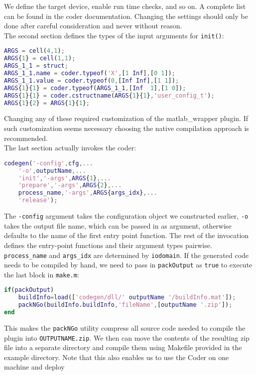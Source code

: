 \documentclass[11pt,a4paper,twoside]{article}
\newcommand{\+}{\discretionary{\mbox{\scriptsize$\hookleftarrow$}}{}{}}
\begin{document}
We define the target device, enable run time checks, and so on.
A complete list can be found in the \Matlab{} coder documentation. Changing the
settings should only be done after careful consideration and never without
reason. \\
The second section defines the types of the input arguments for \texttt{init()}:
\begin{lstlisting}[language=Matlab]
%% Define argument types for entry-point 'init'.
ARGS = cell(4,1);
ARGS{1} = cell(1,1);
ARGS_1_1 = struct;
ARGS_1_1.name = coder.typeof('X',[1 Inf],[0 1]);
ARGS_1_1.value = coder.typeof(0,[Inf Inf],[1 1]);
ARGS{1}{1} = coder.typeof(ARGS_1_1,[Inf  1],[1 0]);
ARGS{1}{1} = coder.cstructname(ARGS{1}{1},'user_config_t');
ARGS{1}{2} = ARGS{1}{1};
\end{lstlisting}
Changing any of these required customization of the matlab\_wrapper plugin. If
such customization seems necessary choosing the native compilation approach is
recommended. \\
The last section actually invokes the \Matlab{} coder:
\begin{lstlisting}[language=Matlab]
codegen('-config',cfg,...
    '-o',outputName,...
    'init','-args',ARGS{1},...
    'prepare','-args',ARGS{2},...
    process_name,'-args',ARGS{args_idx},...
    'release');
\end{lstlisting}
The \texttt{-config} argument takes the configuration object we constructed
earlier, \texttt{-o} takes the output file name, which can be passed in as
argument, otherwise defaults to the name of the first entry point function.
The rest of the invocation defines the entry-point functions and their argument
types pairwise. \texttt{process\_name} and \texttt{args\_idx} are determined by
\texttt{iodomain}.
If the generated code needs to be compiled by hand, we need to
pass in \texttt{packOutput} as \texttt{true} to execute the last block in \texttt{make.m}:
\begin{lstlisting}[language=Matlab]
%% Optionally package the code for deployment elsewhere
if(packOutput)
    buildInfo=load(['codegen/dll/' outputName '/buildInfo.mat']);
    packNGo(buildInfo.buildInfo,'fileName',[outputName '.zip']);
end
\end{lstlisting}
This makes the \texttt{packNGo} utility compress all source code needed to compile
the plugin into \texttt{OUTPUTNAME.zip}.
We then can move the contents of the resulting zip file into a separate
directory and compile them using Makefile provided in the example directory.
Note that this also enables us to use the \Matlab{} Coder on one machine and deploy
\end{document}

